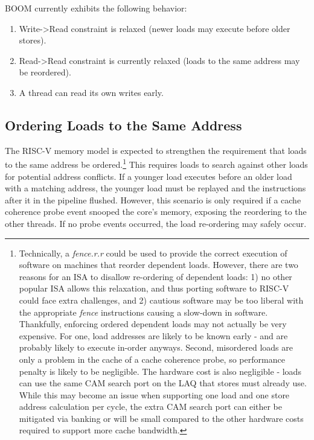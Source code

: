 BOOM currently exhibits the following behavior:

\begin{enumerate}
\item Write->Read constraint is relaxed (newer loads may execute before older stores).
\item Read->Read constraint is currently relaxed (loads to the same address may be reordered). 
\item A thread can read its own writes early. 
\end{enumerate}


\subsection{Ordering Loads to the Same Address}

The RISC-V memory model is expected to strengthen the requirement that loads to the same address be ordered.\footnote{Technically, a {\em fence.r.r} could be used to provide the correct execution of software on machines that reorder dependent loads. However, there are two reasons for an ISA to disallow re-ordering of dependent loads: 1) no other popular ISA allows this relaxation, and thus porting software to RISC-V could face extra challenges, and 2) cautious software may be too liberal with the appropriate {\em fence} instructions causing a slow-down in software. Thankfully, enforcing ordered dependent loads may not actually be very expensive. For one, load addresses are likely to be known early - and are probably likely to execute in-order anyways. Second, misordered loads are only a problem in the cache of a cache coherence probe, so performance penalty is likely to be negligible. The hardware cost is also negligible - loads can use the same CAM search port on the LAQ that stores must already use.  While this may become an issue when supporting one load and one store address calculation per cycle, the extra CAM search port can either be mitigated via banking or will be small compared to the other hardware costs required to support more cache bandwidth.} This requires loads to search against other loads for potential address conflicts. If a younger load executes before an older load with a matching address, the younger load must be replayed and the instructions after it in the pipeline flushed. However, this scenario is only required if a cache coherence probe event snooped the core's memory, exposing the reordering to the other threads.  If no probe events occurred, the load re-ordering may safely occur. 


